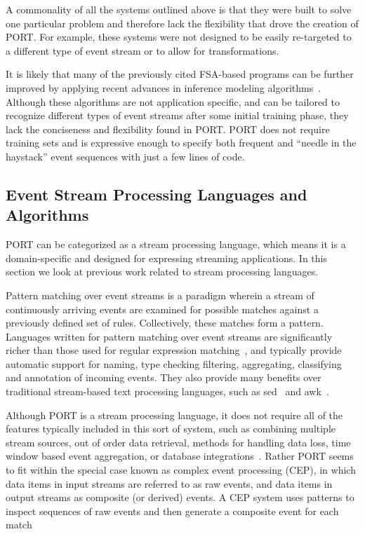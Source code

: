 A commonality
of all the systems
outlined above
is that they were built to solve one particular problem
and
therefore lack the flexibility that drove the creation of PORT.
For example, these systems were not designed to be easily re-targeted
to a different type of event stream or to allow for transformations.

It is likely that many of the previously cited FSA-based programs can be further improved by applying recent advances in inference modeling algorithms~\cite{MarianiPS17,WalkinshawTD13,EmamM18,BeschastnikhBEK14}. Although these algorithms are not application specific, and can be tailored to recognize different types of event streams after some initial training phase, they lack the conciseness and flexibility found in PORT. PORT does not require training sets and is expressive enough to specify both frequent and  “needle in the haystack” event sequences with just a few lines of code.


\subsection{Event Stream Processing Languages and Algorithms}
PORT can be categorized as a stream processing language,
which means it is a domain-specific and
designed for expressing streaming applications.
In this section we look at previous work related to stream processing languages.

Pattern matching
over event streams is a paradigm
wherein a stream of continuously arriving events are examined for
possible matches against a previously defined set of rules. Collectively, these matches form a pattern.
Languages written for pattern matching over event
streams are significantly richer than those used for regular expression
matching~\cite{DBLP:conf/sigmod/AgrawalDGI08},
and typically provide automatic
support for naming, type checking filtering, aggregating, classifying and
annotation of incoming events. They also  provide many benefits over traditional
stream-based text processing languages, such as sed~\cite{Mcmahon1979sed} and
awk~\cite{DBLP:journals/spe/AhoKW79}.

Although PORT is a stream processing language, it does not
require all of the features typically
included in this sort of system, such as
combining multiple stream sources,
out of order data retrieval,
methods for handling data loss,
time window based event aggregation,
or database integrations~\cite{DBLP:journals/csur/DayarathnaP18}.
Rather PORT seems to fit within the special case
known as complex event processing (CEP),
in which data items in input streams are referred to as raw events, and data items in output streams
as composite (or derived) events. A CEP system uses patterns to inspect
sequences of raw events and then generate a composite event for each
match~\cite{DBLP:journals/ibmrd/HirzelAGJKKMNSSW13}

